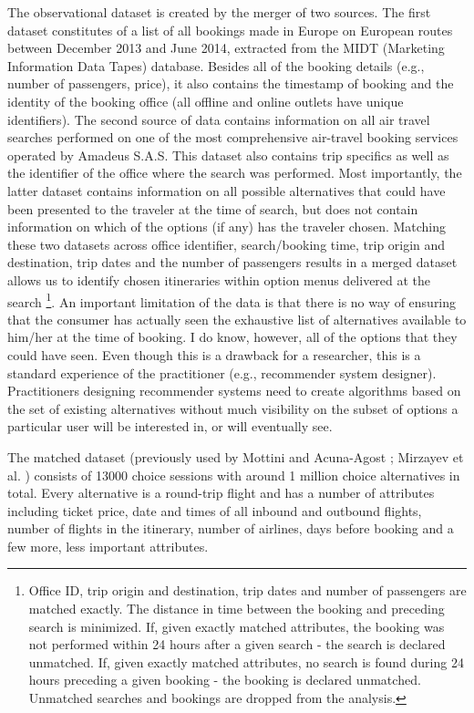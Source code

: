 \documentclass[a4paper,12pt]{article}
\newcommand{\citeyearonly}[1]{\citeyearpar{#1}}
\begin{document}
The observational dataset is created by the merger of two sources. The first dataset constitutes of a list of all bookings made in Europe on European routes between December 2013 and June 2014, extracted from the MIDT (Marketing Information Data Tapes) database. Besides all of the booking details (e.g., number of passengers, price), it also contains the timestamp of booking and the identity of the booking office (all offline and online outlets have unique identifiers). The second source of data contains information on all air travel searches performed on one of the most comprehensive air-travel booking services operated by Amadeus S.A.S. This dataset also contains trip specifics as well as the identifier of the office where the search was performed. Most importantly, the latter dataset contains information on all possible alternatives that could have been presented to the traveler at the time of search, but does not contain information on which of the options (if any) has the traveler chosen. Matching these two datasets across office identifier, search/booking time, trip origin and destination, trip dates and the number of passengers results in a merged dataset allows us to identify chosen itineraries within option menus delivered at the search \footnote{  Office ID, trip origin and destination, trip dates and number of passengers are matched exactly. The distance in time between the booking and preceding search is minimized. If, given exactly matched attributes, the booking was not performed within 24 hours after a given search - the search is declared unmatched. If, given exactly matched attributes, no search is found during 24 hours preceding a given booking - the booking is declared unmatched. Unmatched searches and bookings are dropped from the analysis.}.  An important limitation of the data is that there is no way of ensuring that the consumer has actually seen the exhaustive list of alternatives available to him/her at the time of booking. I do know, however, all of the options that they could have seen. Even though this is a drawback for a researcher, this is a standard experience of the practitioner (e.g., recommender system designer). Practitioners designing recommender systems need to create algorithms based on the set of existing alternatives without much visibility on the subset of options a particular user will be interested in, or will eventually see.

The matched dataset (previously used by Mottini and Acuna-Agost \citeyearonly{mottiniAcunaAgost17}; Mirzayev et al. \citeyearonly{mirzayevEtAl21}) consists of 13000 choice sessions with around 1 million choice alternatives in total. Every alternative is a round-trip flight and has a number of attributes including ticket price, date and times of all inbound and outbound flights, number of flights in the itinerary, number of airlines, days before booking and a few more, less important attributes.
\end{document}
